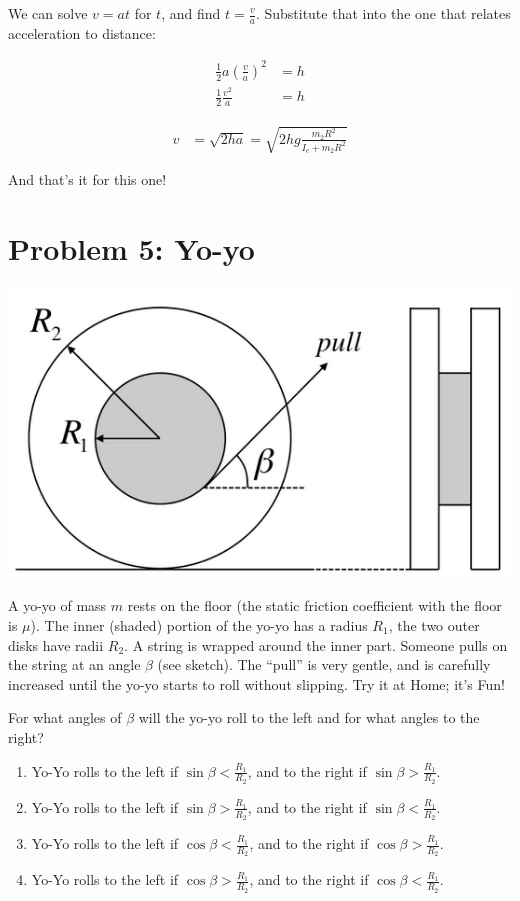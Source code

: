 \documentclass[8.01x]{subfiles}
\begin{document}
We can solve $v = a t$ for $t$, and find $\displaystyle t = \frac{v}{a}$. Substitute that into the one that relates acceleration to distance:

\begin{align}
\frac{1}{2} a \left(\frac{v}{a}\right)^2 &= h\\
\frac{1}{2} \frac{v^2}{a} &= h
\end{align}

\begin{align}
v &= \sqrt{2 h a} = \sqrt{2 h g \frac{m_2 R^2}{I_c + m_2 R^2}}
\end{align}

And that's it for this one!

\section{Problem 5: Yo-yo}

\begin{center}
\includegraphics[scale=0.45]{Graphics/h7p5}
\end{center}

A yo-yo of mass $m$ rests on the floor (the static friction coefficient with the floor is $\mu$). The inner (shaded) portion of the yo-yo has a radius $R_1$, the two outer disks have radii $R_2$. A string is wrapped around the inner part. Someone pulls on the string at an angle $\beta$ (see sketch). The ``pull'' is very gentle, and is carefully increased until the yo-yo starts to roll without slipping. Try it at Home; it's Fun!

For what angles of $\beta$ will the yo-yo roll to the left and for what angles to the right?

\begin{enumerate}
\item Yo-Yo rolls to the left if $\displaystyle \sin \beta < \frac{R_1}{R_2}$, and to the right if $\displaystyle \sin \beta > \frac{R_1}{R_2}$.
\item Yo-Yo rolls to the left if $\displaystyle \sin \beta > \frac{R_1}{R_2}$, and to the right if $\displaystyle \sin \beta < \frac{R_1}{R_2}$.
\item Yo-Yo rolls to the left if $\displaystyle \cos \beta < \frac{R_1}{R_2}$, and to the right if $\displaystyle \cos \beta > \frac{R_1}{R_2}$.
\item Yo-Yo rolls to the left if $\displaystyle \cos \beta > \frac{R_1}{R_2}$, and to the right if $\displaystyle \cos \beta < \frac{R_1}{R_2}$.
\end{enumerate}
\end{document}
